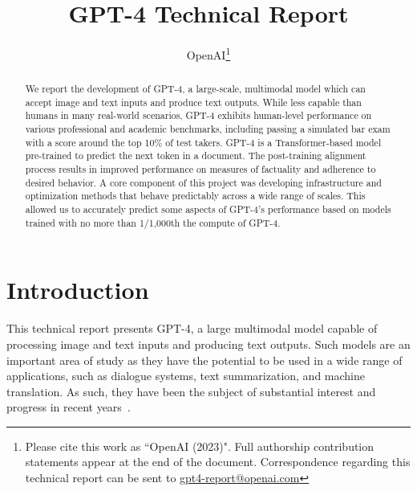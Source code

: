 \documentclass{article}
\title{GPT-4 Technical Report}
\author{OpenAI\thanks{Please cite this work as ``OpenAI (2023)". Full authorship contribution statements appear at the end of the document. Correspondence regarding this technical report can be sent to \url{gpt4-report@openai.com}}}
\newif\ifcomment
\begin{document}
\commenttrue 

\maketitle

\begin{abstract}
We report the development of GPT-4, a large-scale, multimodal model which can accept image and text inputs and produce text outputs. While less capable than humans in many real-world scenarios, GPT-4 exhibits human-level performance on various professional and academic benchmarks, including passing a simulated bar exam with a score around the top 10\% of test takers.
GPT-4 is a Transformer-based model pre-trained to predict the next token in a document.
The post-training alignment process results in improved performance on measures of factuality and adherence to desired behavior.
A core component of this project was developing infrastructure and optimization methods that behave predictably across a wide range of scales. This allowed us to accurately predict some aspects of GPT-4's performance based
on models trained with no more than 1/1,000th the compute of GPT-4.

\end{abstract}

\section{Introduction}

This technical report presents GPT-4, a large multimodal model capable of processing image and text inputs and producing text outputs. Such models are an important area of study as they have the potential to be used in a wide range of applications, such as dialogue systems, text summarization, and machine translation. As such, they have been the subject of substantial interest and progress in recent years~\citep{brown2020language,hoffmann2022training,chowdhery2022palm,rae2021scaling,dai2019transformer,liu2019roberta,devlin2018bert,raffel2019exploring,shazeer2018adafactor,ba2016layer,wei2022chain,huang2022selfimprovement,kojima2022zeroshotreasoner,kaplan2020scaling,henighan2020scaling,yang2022tensor,shazeer2017outrageously,zoph2022stmoe,wei2022emergent,dehghani2018universal,su2021roformer,alayracflamingo,chen2022pali,wang2021gpt,black2021gpt,scao2022bloom,zhang2022opt,touvron2023llama,radford2017sentiment,lample2019crosslingual,dao2022flashattention,child2019generating,rabe2021selfattention,Gray2017GPUKF}.
\end{document}
